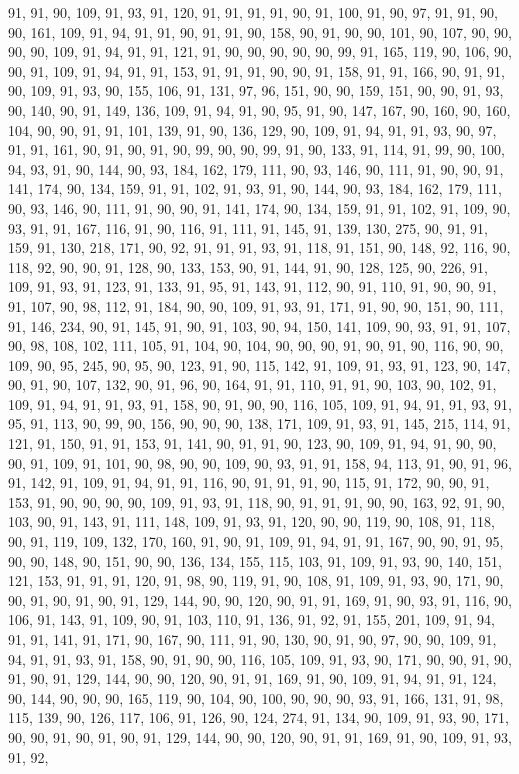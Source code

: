 \begin{sloppypar}
91, 91, 90, 109, 91, 93, 91, 120, 91, 91, 91, 91, 90, 91, 100, 91, 90, 97, 91, 91, 90, 90, 161, 109, 91, 94, 91, 91, 90, 91, 91, 90, 158, 90, 91, 90, 90, 101, 90, 107, 90, 90, 90, 90, 109, 91, 94, 91, 91, 121, 91, 90, 90, 90, 90, 90, 99, 91, 165, 119, 90, 106, 90, 90, 91, 109, 91, 94, 91, 91, 153, 91, 91, 91, 90, 90, 91, 158, 91, 91, 166, 90, 91, 91, 90, 109, 91, 93, 90, 155, 106, 91, 131, 97, 96, 151, 90, 90, 159, 151, 90, 90, 91, 93, 90, 140, 90, 91, 149, 136, 109, 91, 94, 91, 90, 95, 91, 90, 147, 167, 90, 160, 90, 160, 104, 90, 90, 91, 91, 101, 139, 91, 90, 136, 129, 90, 109, 91, 94, 91, 91, 93, 90, 97, 91, 91, 161, 90, 91, 90, 91, 90, 99, 90, 90, 99, 91, 90, 133, 91, 114, 91, 99, 90, 100, 94, 93, 91, 90, 144, 90, 93, 184, 162, 179, 111, 90, 93, 146, 90, 111, 91, 90, 90, 91, 141, 174, 90, 134, 159, 91, 91, 102, 91, 93, 91, 90, 144, 90, 93, 184, 162, 179, 111, 90, 93, 146, 90, 111, 91, 90, 90, 91, 141, 174, 90, 134, 159, 91, 91, 102, 91, 109, 90, 93, 91, 91, 167, 116, 91, 90, 116, 91, 111, 91, 145, 91, 139, 130, 275, 90, 91, 91, 159, 91, 130, 218, 171, 90, 92, 91, 91, 91, 93, 91, 118, 91, 151, 90, 148, 92, 116, 90, 118, 92, 90, 90, 91, 128, 90, 133, 153, 90, 91, 144, 91, 90, 128, 125, 90, 226, 91, 109, 91, 93, 91, 123, 91, 133, 91, 95, 91, 143, 91, 112, 90, 91, 110, 91, 90, 90, 91, 91, 107, 90, 98, 112, 91, 184, 90, 90, 109, 91, 93, 91, 171, 91, 90, 90, 151, 90, 111, 91, 146, 234, 90, 91, 145, 91, 90, 91, 103, 90, 94, 150, 141, 109, 90, 93, 91, 91, 107, 90, 98, 108, 102, 111, 105, 91, 104, 90, 104, 90, 90, 90, 91, 90, 91, 90, 116, 90, 90, 109, 90, 95, 245, 90, 95, 90, 123, 91, 90, 115, 142, 91, 109, 91, 93, 91, 123, 90, 147, 90, 91, 90, 107, 132, 90, 91, 96, 90, 164, 91, 91, 110, 91, 91, 90, 103, 90, 102, 91, 109, 91, 94, 91, 91, 93, 91, 158, 90, 91, 90, 90, 116, 105, 109, 91, 94, 91, 91, 93, 91, 95, 91, 113, 90, 99, 90, 156, 90, 90, 90, 138, 171, 109, 91, 93, 91, 145, 215, 114, 91, 121, 91, 150, 91, 91, 153, 91, 141, 90, 91, 91, 90, 123, 90, 109, 91, 94, 91, 90, 90, 90, 91, 109, 91, 101, 90, 98, 90, 90, 109, 90, 93, 91, 91, 158, 94, 113, 91, 90, 91, 96, 91, 142, 91, 109, 91, 94, 91, 91, 116, 90, 91, 91, 91, 90, 115, 91, 172, 90, 90, 91, 153, 91, 90, 90, 90, 90, 109, 91, 93, 91, 118, 90, 91, 91, 91, 90, 90, 163, 92, 91, 90, 103, 90, 91, 143, 91, 111, 148, 109, 91, 93, 91, 120, 90, 90, 119, 90, 108, 91, 118, 90, 91, 119, 109, 132, 170, 160, 91, 90, 91, 109, 91, 94, 91, 91, 167, 90, 90, 91, 95, 90, 90, 148, 90, 151, 90, 90, 136, 134, 155, 115, 103, 91, 109, 91, 93, 90, 140, 151, 121, 153, 91, 91, 91, 120, 91, 98, 90, 119, 91, 90, 108, 91, 109, 91, 93, 90, 171, 90, 90, 91, 90, 91, 90, 91, 129, 144, 90, 90, 120, 90, 91, 91, 169, 91, 90, 93, 91, 116, 90, 106, 91, 143, 91, 109, 90, 91, 103, 110, 91, 136, 91, 92, 91, 155, 201, 109, 91, 94, 91, 91, 141, 91, 171, 90, 167, 90, 111, 91, 90, 130, 90, 91, 90, 97, 90, 90, 109, 91, 94, 91, 91, 93, 91, 158, 90, 91, 90, 90, 116, 105, 109, 91, 93, 90, 171, 90, 90, 91, 90, 91, 90, 91, 129, 144, 90, 90, 120, 90, 91, 91, 169, 91, 90, 109, 91, 94, 91, 91, 124, 90, 144, 90, 90, 90, 165, 119, 90, 104, 90, 100, 90, 90, 90, 93, 91, 166, 131, 91, 98, 115, 139, 90, 126, 117, 106, 91, 126, 90, 124, 274, 91, 134, 90, 109, 91, 93, 90, 171, 90, 90, 91, 90, 91, 90, 91, 129, 144, 90, 90, 120, 90, 91, 91, 169, 91, 90, 109, 91, 93, 91, 92, 
\end{sloppypar}
